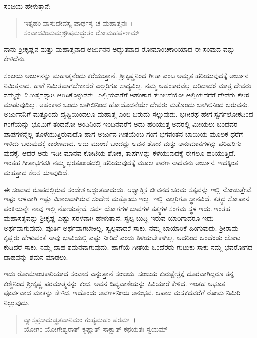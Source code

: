ಸಂಜಯ ಹೇಳುತ್ತಾನೆ:

\begin{verse}
ಇತ್ಯಹಂ ವಾಸುದೇವಸ್ಯ ಪಾರ್ಥಸ್ಯ ಚ ಮಹಾತ್ಮನಃ~।\\ಸಂವಾದಮಿಮಮಶ್ರೌಷಮದ್ಭುತಂ ರೋಮಹರ್ಷಣಮ್ 
\end{verse}

{\small ನಾನು ಶ‍್ರೀಕೃಷ್ಣನ ಮತ್ತು ಮಹಾತ್ಮನಾದ ಅರ್ಜುನನ ಅದ್ಭುತವಾದ ರೋಮಾಂಚಕಾರಿಯಾದ ಈ ಸಂವಾದ ವನ್ನು ಕೇಳಿದೆನು.}

ಸಂಜಯ ಅರ್ಜುನನ್ನು ಮಹಾತ್ಮನೆಂದು ಕರೆಯುತ್ತಾನೆ. ಶ‍್ರೀಕೃಷ್ಣನಿಂದ ಗೀತಾ ಎಂಬ ಅಮೃತ ಹರಿಯುವುದಕ್ಕೆ ಅರ್ಜುನ ನಿಮಿತ್ತನಾದ. ಹಾಗೆ ನಿಮಿತ್ತವಾಗಬೇಕಾದರೆ ಎಲ್ಲರಿಗೂ ಸಾಧ್ಯವಿಲ್ಲ. ನಮ್ಮ ಅಹಂಕಾರವೆಲ್ಲ ಬರಿದಾದರೆ ಮಾತ್ರ ದೇವರು ನಮ್ಮನ್ನು ನಿಮಿತ್ತವನ್ನಾಗಿ ಆರಿಸಿಕೊಳ್ಳುವನು. ಎಲ್ಲಿಯವರೆಗೆ ಅಹಂಕಾರ ತುಂಬಿದೆಯೋ ಅಲ್ಲಿಯವರೆಗೆ ದೇವರು ಕೆಲಸ ಮಾಡುವುದಿಲ್ಲ. ಅಹಂಕಾರ ಒಂದು ಬಾಗಿಲಿನಿಂದ ಹೋದೊಡನೆಯೇ ದೇವರು ಮತ್ತೊಂದು ಬಾಗಿಲಿನಿಂದ ಬರುವನು. ಅರ್ಜುನನಿಗೆ ಮತ್ತೊಂದು ದೃಷ್ಟಿಯಿಂದಲೂ ಮಹಾತ್ಮ ಎಂಬ ಬಿರುದು ಸಲ್ಲುವುದು. ಭಗೀರಥ ಹೇಗೆ ಸ್ವರ್ಗಲೋಕದಿಂದ ಗಂಗೆಯನ್ನು ಭೂಮಿಗೆ ತಂದನೋ ಅಂದಿನಿಂದ ಇಂದಿನವರೆಗೆ ಅದು ಹರಿಯುತ್ತ ಅದರಲ್ಲಿ ಮೀಯಲು ಬಂದವರ ಪಾಪಗಳನ್ನೆಲ್ಲ ತೊಳೆಯುತ್ತಿರುವುದೊ ಹಾಗೆ ಅರ್ಜುನ ಗೀತೆಯೆಂಬ ಗಂಗೆ ಭಗವಂತನ ಬಾಯಿಯ ಮೂಲಕ ಧರೆಗೆ ಇಳಿದು ಬರುವುದಕ್ಕೆ ಕಾರಣವಾದ. ಅದು ಮುಂಚೆ ಬಂದದ್ದು ಅವನ ಶೋಕ ಮತ್ತು ಅನುಮಾನಗಳನ್ನು ಪರಿಹರಿಸು ವುದಕ್ಕೆ. ಆದರೆ ಅದು ಇಡೀ ಮಾನವ ಕೋಟಿಯ ಶೋಕ, ತಾಪಗಳನ್ನು ಕಳೆಯುವುದಕ್ಕೆ ಈಗಲೂ ಹರಿಯುತ್ತಿದೆ. ಇಂತಹ ಗೀತಾಭಗವತಿ ನಮ್ಮ ಭರತಖಂಡದಲ್ಲಿ ಹರಿಯುವುದಕ್ಕೆ ಮೂಲ ಕಾರಣ ನಾದವನು ಅರ್ಜುನ. ಇದಕ್ಕಿಂತ ಮಹತ್ತಾದ ಕೆಲಸ ಯಾವುದಿದೆ.

ಈ ಸಂವಾದ ರೂಪದಲ್ಲಿರುವ ಸಂದೇಶ ಅದ್ಭುತವಾದುದು. ಆಧ್ಯಾತ್ಮಿಕ ಜೀವನದ ಚರಮ ಸತ್ಯವನ್ನು ಇಲ್ಲಿ ನೋಡುತ್ತೇವೆ. ಇಷ್ಟು ಆಳವಾಗಿ ಇಷ್ಟು ವಿಶಾಲವಾಗಿರುವ ಸಂದೇಶ ಮತ್ತೊಂದು ಇಲ್ಲ. ಇಲ್ಲಿ ಎಲ್ಲರಿಗೂ ಸ್ಥಾನವಿದೆ. ತತ್ತ್ವದ ಸೋಪಾನ ಪಂಕ್ತಿಯನ್ನೇ ನಾವು ಇಲ್ಲಿ ನೋಡುತ್ತೇವೆ. ಸರ್ವ ಯೋಗಗಳ ಭಾವಗಳ ತತ್ತ್ವಗಳ ಸಂಗಮ ಸ್ಥಳ ಇದು. ಇಂತಹ ಮಹಾಸತ್ಯವನ್ನು ಶ‍್ರೀಕೃಷ್ಣ ಎಷ್ಟು ಸರಳವಾಗಿ ಹೇಳುತ್ತಾನೆ. ಸ್ವಲ್ಪ ಬುದ್ಧಿ ಇರುವ ಯಾರಿಗಾದರೂ ಇದು ಅರ್ಥವಾಗುವುದು. ಪೂರ್ತಿ ಅರ್ಥವಾಗಬೇಕಿಲ್ಲ. ಸ್ವಲ್ಪವಾದರೆ ಸಾಕು, ನಮ್ಮ ಬಾಯಾರಿಕೆ ಹಿಂಗುವುದು. ಶ‍್ರೀರಾಮ ಕೃಷ್ಣರು ಹೇಳುವಂತೆ ನಾವು ಭಾವಿಯಲ್ಲಿ ಎಷ್ಟು ನೀರಿದೆ ಎಂದು ತಿಳಿಯಬೇಕಾಗಿಲ್ಲ. ಅದರಿಂದ ಒಂದೆರಡು ಲೋಟ ಕುಡಿದರೆ ಸಾಕು, ನಮ್ಮ ದಾಹ ಶಮನವಾಗುವುದು. ಹಾಗೆಯೆ ಗೀತೆಯ ಒಂದೆರಡು ಗುಟುಕು ಸಾಕು ನಮ್ಮ ಭವರೋಗದ ದಾಹವನ್ನು ಶಮನ ಮಾಡಲು.

ಇದು ರೋಮಾಂಚಕಾರಿಯಾದ ಸಂವಾದ ಎನ್ನುತ್ತಾನೆ ಸಂಜಯ. ಸಂಜಯ ಕುರುಕ್ಷೇತ್ರಕ್ಕೆ ದೂರವಾಗಿದ್ದರೂ ತನ್ನ ಕಣ್ಣಿನಿಂದ ಶ‍್ರೀಕೃಷ್ಣ ಪರಮಾತ್ಮನನ್ನು ಕಂಡ. ಅವನ ದಿವ್ಯವಾಣಿಯನ್ನು ಕಿವಿಯಾರೆ ಕೇಳಿದ. ಇಂತಹ ಅಭೂತ ಪೂರ್ವವಾದ ಮಾತನ್ನು ಕೇಳಿದ. ಇದೊಂದು ಅವರ್ಣನೀಯ ಅನುಭವ. ಆಪಾದ ಮಸ್ತಕದವರೆಗೆ ರೋಮ ನಿಮಿರಿ ನಿಲ್ಲುವುದು.

\begin{verse}
ವ್ಯಾಸಪ್ರಸಾದುಚ್ಛ್ರತವಾನಿಮಂ ಗುಹ್ಯಮಹಂ ಪರಮ್~।\\ಯೋಗಂ ಯೋಗೇಶ್ವರಾತ್ ಕೃಷ್ಣಾತ್ ಸಾಕ್ಷಾತ್ ಕಥಯತಃ ಸ್ವಯಮ್ 
\end{verse}

